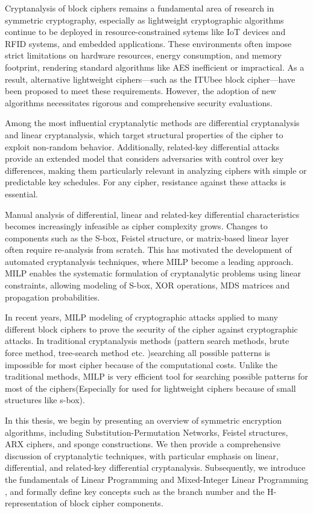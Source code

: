 Cryptanalysis of block ciphers remains a fundamental area of research in symmetric cryptography, especially as lightweight cryptographic algorithms continue to be deployed in resource-constrained sytems like IoT devices and RFID systems, and embedded applications. These environments often impose strict limitations on hardware resources, energy consumption, and memory footprint, rendering standard algorithms like AES inefficient or impractical. As a result, alternative lightweight ciphers—such as the ITUbee block cipher—have been proposed to meet these requirements. However, the adoption of new algorithms necessitates rigorous and comprehensive security evaluations.

Among the most influential cryptanalytic methods are differential cryptanalysis and linear cryptanalysis, which target structural properties of the cipher to exploit non-random behavior. Additionally, related-key differential attacks provide an extended model that considers adversaries with control over key differences, making them particularly relevant in analyzing ciphers with simple or predictable key schedules. For any cipher, resistance against these attacks is essential.

Manual analysis of differential, linear and related-key differential characteristics becomes increasingly infeasible as cipher complexity grows. Changes to components such as the S-box, Feistel structure, or matrix-based linear layer often require re-analysis from scratch. This has motivated the development of automated cryptanalysis techniques, where MILP become a leading approach. MILP enables the systematic formulation of cryptanalytic problems using linear constraints, allowing  modeling of S-box, XOR operations, MDS matrices and propagation probabilities.

In recent years, MILP modeling of cryptographic attacks applied to many different block ciphers to prove the security of the cipher against cryptographic attacks. In traditional cryptanalysis methods (pattern search methods, brute force method, tree-search method etc. )searching all possible patterns is impossible for most cipher because of the computational costs. Unlike the traditional methods, MILP is very efficient tool for searching possible patterns for most of the ciphers(Especially for used for lightweight ciphers because of small structures like s-box). 

In this thesis, we begin by presenting an overview of symmetric encryption algorithms, including Substitution-Permutation Networks, Feistel structures, ARX ciphers, and sponge constructions. We then provide a comprehensive discussion of cryptanalytic techniques, with particular emphasis on linear, differential, and related-key differential cryptanalysis. Subsequently, we introduce the fundamentals of Linear Programming  and Mixed-Integer Linear Programming , and formally define key concepts such as the branch number and the H-representation of block cipher components.

